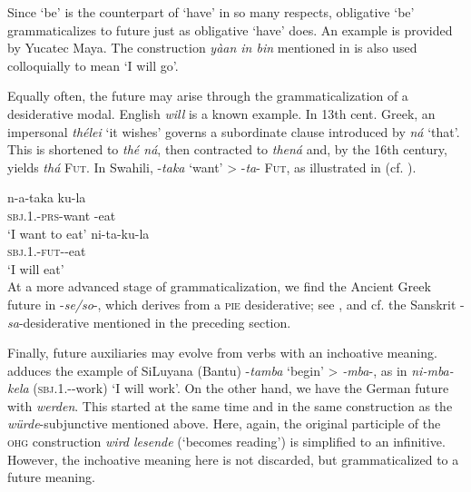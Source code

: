 Since ‘be’ is the counterpart of ‘have’ in so many respects, obligative ‘be’ grammaticalizes to future just as obligative ‘have’ does. An example is provided by Yucatec Maya. The construction \textit{yàan in bin} mentioned in  is also used colloquially to mean ‘I will go’.

Equally often, the future may arise through the grammaticalization of a desiderative modal. English \textit{will} is a known example. In 13th cent. Greek, an impersonal \textit{thélei} ‘it wishes’ governs a subordinate clause introduced by \textit{ná} ‘that’. This is shortened to \textit{thé ná}, then contracted to \textit{thená} and, by the 16th century, yields \textit{thá} \textsc{Fut}. In Swahili, -\textit{taka} ‘want’ {\textgreater} -\textit{ta}{}- \textsc{Fut}, as illustrated in  (cf. \citealt[131]{HeineEtAl1984}).


\ea\label{ex:E2}
 \ea
 \gll n-a-taka ku-la \\   
 \textsc{sbj}.1.\glsg-\textsc{prs}-want  \glinf-eat  \\
\glt ‘I want to eat’
 \ex
 \gll ni-ta-ku-la \\
 \textsc{sbj}.1.\glsg-\textsc{fut}-\glinf-eat\\
 \glt ‘I will eat’ \\
\z
\z
\noindent At a more advanced stage of grammaticalization, we find the Ancient Greek future in -\textit{se/so}{}-, which derives from a \textsc{pie} desiderative; see \citet[224f]{Rix1976}, and cf. the Sanskrit -\textit{sa}{}-desiderative mentioned in the preceding section.

Finally, future auxiliaries may evolve from verbs with an inchoative meaning. \citet[917]{Givón1973} adduces the example of SiLuyana (Bantu) -\textit{tamba} ‘begin’ {\textgreater} \mbox{\textit{-mba}}-\scfut, as in \textit{ni-mba-kela} (\textsc{sbj}.1.\glsg{}-\scfut-work) ‘I will work’. On the other hand, we have the German future with \textit{werden}. This started at the same time and in the same construction as the \textit{würde}{}-subjunctive mentioned above. Here, again, the original participle of the \textsc{ohg} construction \textit{wird lesende} (‘becomes reading’) is simplified to an infinitive. However, the inchoative meaning here is not discarded, but grammaticalized to a future meaning.


